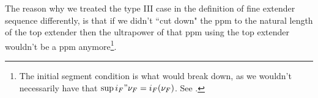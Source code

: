 
The reason why we treated the type III case in the definition of fine extender sequence differently, is that if we didn't ``cut down" the ppm to the natural length of the top extender then the ultrapower of that ppm using the top extender wouldn't be a ppm anymore\footnote{The initial segment condition is what would break down, as we wouldn't necessarily have that $\sup i_F"\nu_F=i_F(\nu_F)$. See \cite[Lemma 9.1]{FSIT}.}. 


